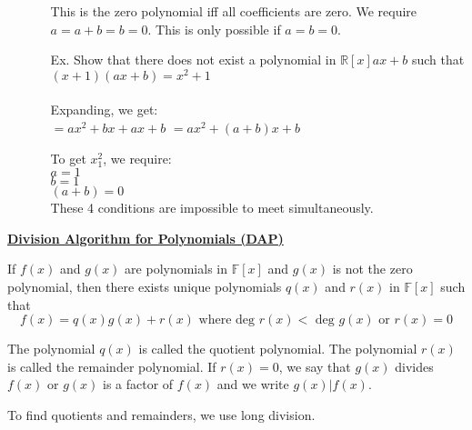 \documentclass{letter}
\begin{document}
\begin{enumerate}[i)]
\begin{itemize}
			This is the zero polynomial iff all coefficients are zero. We require $a = a+b = b = 0$. This is only possible if $a = b = 0$.
			
			\item[Ex. ] Show that there does not exist a polynomial in $\mathbb{R}\left[ x \right] ax + b$ such that $(x+1)(ax + b) = x^2 + 1$\\\\
			Expanding, we get:\\
			$= ax^2 + bx + ax + b$
			$= ax^2 + (a+b)x + b$
			
			To get $x^2 _ 1$, we require:\\
			$a = 1$\\
			$b = 1$\\
			$(a+b) = 0$\\
			These 4 conditions are impossible to meet simultaneously.
		\end{itemize}
	\end{enumerate}
	
	\underline{\textbf{Division Algorithm for Polynomials (DAP)}}
	
	If $f(x)$ and $g(x)$ are polynomials in $\mathbb{F} \left[ x \right]$ and $g(x)$ is not the zero polynomial, then there exists unique polynomials $q(x)$ and $r(x)$ in $\mathbb{F}\left[ x \right]$ such that\\
	\[ f(x) = q(x)g(x) + r(x) \text{ where deg } r(x) < \text{ deg } g(x) \text{ or } r(x) = 0 \]
	
	The polynomial $q(x)$ is called the quotient polynomial. The polynomial $r(x)$ is called the remainder polynomial. If $r(x) = 0$, we say that $g(x)$ divides $f(x)$ or $g(x)$ is a factor of $f(x)$ and we write $g(x) \vert f(x)$.
	
	To find quotients and remainders, we use long division.
\end{document}

